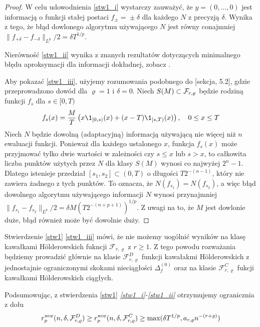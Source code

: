 \documentclass[oik, pdftex, robocza, man]{mgrwms}
\begin{document}
    \begin{proof}
        W celu udowodnienia \ref{stw1_i} wystarczy zauważyć, że $y = (0, \ldots, 0)$ jest informacją o funkcji stałej postaci $f_{\pm} \!=\! \pm \delta$ dla każdego $N$ z precyzją $\delta$. Wynika z tego, że błąd dowlonego algorytmu używającego $N$ jest równy conajmniej $\| f_{+\delta} - f_{-\delta} \|_{L^{p}} / 2 = \delta T^{1/p}$.

        Nierówność \ref{stw1_ii} wynika z znanych rezultatów dotyczących minimalnego błędu aproksymacji dla informacji dokładnej, zobacz \cite{DaS}.

        Aby pokazać \ref{stw1_iii}, użyjemy rozumowania podobnego do \cite{PoA} [sekcja, 5.2], gdzie przeprowadzono dowód dla $\varrho = 1$ i $\delta = 0$. Niech $S(M) \subset \mathcal{F}_{r, \varrho}$ będzie rodziną funkcji $f_{s}$ dla $s \in [0, T)$
        \begin{equation*}
            f_{s}(x) = \frac{M}{T}\left( x\1_{[0,s)}(x) + (x-T)\1_{[s,T)}(x) \right), \quad 0 \leq x \leq T
        \end{equation*}
        Niech $N$ będzie dowolną (adaptacyjną) informacją używającą nie więcej niż $n$ ewaluacji funkcji. Ponieważ dla każdego ustalonego $x$, funkcja $f_{s}(x)$ może przyjmować tylko dwie wartości w zależności czy $s \leq x$ lub $s > x$, to całkowita liczba punktów użytych przez $N$ dla klasy $S(M)$ wynosi co najwyżej $2^{n}-1$. Dlatego istenieje przedział $[s_{1}, s_{2}] \subset (0,T)$ o długości $T 2^{-(n-1)}$, który nie zawiera żadnego z tych punktów. To oznacza, że  $N(f_{s_{1}}) = N(f_{s_{2}})$, a więc błąd dowolnego algorytmu używającego informacji $N$ wynosi przynajmniej $\| f_{s_{1}} - f_{s_{2}} \|_{L^{p}} / 2 = \delta M(T 2^{-(n+p+1)})^{1/p}$. Z uwagi na to, że $M$ jest dowlonie duże, błąd również może być dowolnie duży.
    \end{proof}

    Stwierdzenie \ref{stw1} \ref{stw1_iii} mówi, że nie możemy uogólnić wyników na klasę kawałkami Hölderowskich fukncji $\mathcal{F}_{r,\varrho}$ z $r \geq 1$. Z tego powodu rozważania będziemy prowadzić głównie na klasie $\mathcal{F}_{r,\varrho}^{D}$ funkcji kawałakmi Hölderowskich z jednostajnie ograniczonymi skokami nieciągłości $\Delta_{f}^{(0)}$ oraz na klasie $\mathcal{F}_{r,\varrho}^{C}$ fukcji kawałkami Hölderowskich ciągłych.

    Podsumowując, z stwierdzenia \ref{stw1} \textit{\ref{stw1_i}-\ref{stw1_ii}} otrzymujemy ogranicznia z dołu
    \begin{equation*}
        r^{\mathrm{wor}}_{p}(n, \delta, \mathcal{F}^{D}_{r,\varrho}) \geq r^{\mathrm{wor}}_{p}(n, \delta, \mathcal{F}^{C}_{r,\varrho}) \geq \max(\delta T^{1/p}, a_{r,\varrho} n^{-(r+\varrho)})
    \end{equation*}
\end{document}
